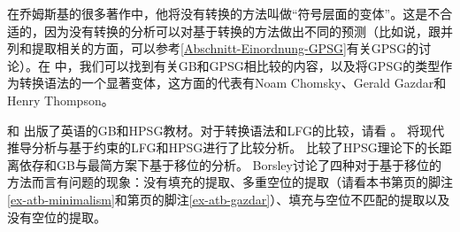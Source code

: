 {在乔姆斯基的很多著作中，他将没有转换的方法叫做“符号层面的变体”。这是不合适的，因为没有转换的分析可以对基于转换的方法做出不同的预测（比如说，跟并列和提取相关的方面，可以参考\ref{Abschnitt-Einordnung-GPSG}有关GPSG的讨论）。在 中，我们可以找到有关GB和GPSG相比较的内容，以及将GPSG的类型作为转换语法的一个显著变体，这方面的代表有Noam Chomsky、Gerald Gazdar和Henry Thompson。

 \citet{Borsley99a-u}和 \citet{KS2008a-u}出版了英语的GB和HPSG教材。对于转换语法和LFG的比较，请看 。 将现代推导分析与基于约束的LFG和HPSG进行了比较分析。 \citet{Borsley2012a}比较了HPSG理论下的长距离依存和GB与最简方案下基于移位的分析。 Borsley讨论了四种对于基于移位的方法而言有问题的现象：没有填充的提取、多重空位的提取（请看本书第\pageref{ex-atb-minimalism}页的脚注\ref{ex-atb-minimalism}和第\pageref{ex-atb-gazdar}页的脚注\ref{ex-atb-gazdar}）、填充与空位不匹配的提取以及没有空位的提取。
}













